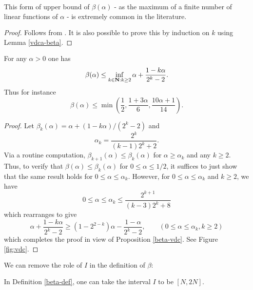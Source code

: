 This form of upper bound of $\beta(\alpha)$ - as the maximum of a finite number of linear functions of $\alpha$ - is extremely common in the literature.

\begin{proof} Follows from \cite[Theorem 8.20]{ik}. It is also possible to prove this by induction on $k$ using Lemma \ref{vdca-beta}.
\end{proof}

    \begin{corollary}\label{vdc-opt}  For any $\alpha > 0$ one has
    $$\beta(\alpha) \leq \inf_{k \in \mathbf{N}: k \geq 2} \alpha + \frac{1-k\alpha}{2^k-2}.$$
    Thus for instance
    $$ \beta(\alpha) \leq \min\left( \frac{1}{2}, \frac{1+3\alpha}{6}, \frac{10\alpha+1}{14}\right).$$
    \end{corollary}

\begin{proof}
Let $\beta_k(\alpha) = \alpha + (1 - k\alpha)/(2^k - 2)$ and
\[
\alpha_k = \frac{2^k}{(k - 1)2^k + 2}.
\]
Via a routine computation, $\beta_{k + 1}(\alpha) \le \beta_k(\alpha)$ for $\alpha \ge \alpha_k$ and any $k \ge 2$. Thus, to verify that $\beta(\alpha) \le \beta_k(\alpha)$ for $0 \le \alpha \le 1/2$, it suffices to just show that the same result holds for $0 \le \alpha \le \alpha_{k}$. However, for $0 \le \alpha \le \alpha_k$ and $k \ge 2$, we have
\[
0 \le \alpha \le \alpha_k \le \frac{2^{k + 1}}{(k - 3)2^k + 8}
\]
which rearranges to give
\[
\alpha + \frac{1-k\alpha}{2^k-2}\geq (1 - 2^{2-k})\alpha - \frac{1-\alpha}{2^k-2},\qquad (0 \le \alpha \le \alpha_k, k \ge 2)
\]
which completes the proof in view of Proposition \ref{beta-vdc}.  See Figure \ref{fig:vdc}.
\end{proof}


We can remove the role of $I$ in the definition of $\beta$:

\begin{lemma}\label{interval-set}  In Definition \ref{beta-def}, one can take the interval $I$ to be $[N,2N]$.
\end{lemma}

